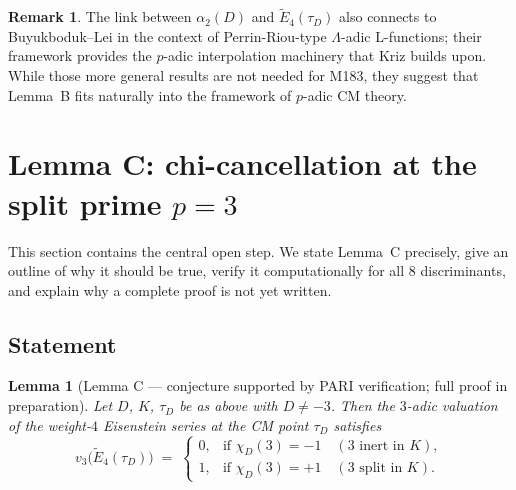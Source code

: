 \documentclass[12pt]{amsart}
\newtheorem{lemma}[theorem]{Lemma}
\theoremstyle{definition}
\newtheorem{remark}[theorem]{Remark}
\begin{document}
\begin{remark}
  The link between $\alpha_2(D)$ and $\widetilde{E}_4(\tau_D)$ also
  connects to Buyukboduk--Lei \cite{BuyukbodukLei2016} in the context of
  Perrin-Riou-type $\Lambda$-adic L-functions; their framework \cite[Thm.~5.1]{BuyukbodukLei2016}
  provides the $p$-adic interpolation machinery that Kriz \cite{Kriz2018}
  builds upon.
  While those more general results are not needed for M183, they suggest
  that Lemma~B fits naturally into the framework of $p$-adic CM theory.
\end{remark}

\section{Lemma C: chi-cancellation at the split prime $p = 3$}
\label{sec:lemmaC}

This section contains the central open step.
We state Lemma~C precisely, give an outline of why it should be true,
verify it computationally for all $8$ discriminants, and explain
why a complete proof is not yet written.

\subsection{Statement}

\begin{lemma}[Lemma C — conjecture supported by PARI verification; full proof in preparation]
  \label{lem:C}
  Let $D$, $K$, $\tau_D$ be as above with $D \neq -3$.
  Then the $3$-adic valuation of the weight-$4$ Eisenstein series at the
  CM point $\tau_D$ satisfies
  \begin{equation}
    \label{eq:vE4}
    v_3\!\bigl(\widetilde{E}_4(\tau_D)\bigr) \;=\;
    \begin{cases}
      0, & \text{if } \chi_D(3) = -1 \quad (\text{$3$ inert in $K$}), \\
      1, & \text{if } \chi_D(3) = +1 \quad (\text{$3$ split in $K$}).
    \end{cases}
  \end{equation}
\end{lemma}
\end{document}
